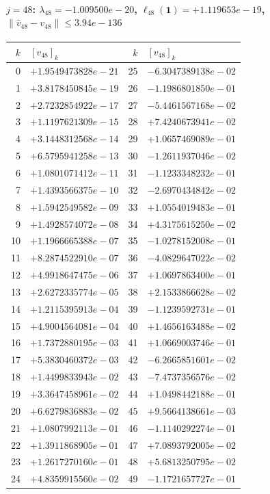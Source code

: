 \documentclass[11pt]{article}
\begin{document}
\paragraph{$j = 48$: $\lambda_{48} = -1.009500e-20$, \quad $\ell_{48}(\mathbf{1}) = +1.119653e-19$, \quad $\|\hat v_{48} - v_{48}\| \leq 3.94e-136$}
\begin{center}
{\footnotesize
\begin{tabular}{r@{\;\;}l@{\quad}r@{\;\;}l}
\toprule
$k$ & $[v_{48}]_k$ & $k$ & $[v_{48}]_k$ \\
\midrule
0 & $+1.9549473828e-21$ & 25 & $-6.3047389138e-02$ \\
1 & $+3.8178450845e-19$ & 26 & $-1.1986801850e-01$ \\
2 & $+2.7232854922e-17$ & 27 & $-5.4461567168e-02$ \\
3 & $+1.1197621309e-15$ & 28 & $+7.4240673941e-02$ \\
4 & $+3.1448312568e-14$ & 29 & $+1.0657469089e-01$ \\
5 & $+6.5795941258e-13$ & 30 & $-1.2611937046e-02$ \\
6 & $+1.0801071412e-11$ & 31 & $-1.1233348232e-01$ \\
7 & $+1.4393566375e-10$ & 32 & $-2.6970434842e-02$ \\
8 & $+1.5942549582e-09$ & 33 & $+1.0554019483e-01$ \\
9 & $+1.4928574072e-08$ & 34 & $+4.3175615250e-02$ \\
10 & $+1.1966665388e-07$ & 35 & $-1.0278152008e-01$ \\
11 & $+8.2874522910e-07$ & 36 & $-4.0829647022e-02$ \\
12 & $+4.9918647475e-06$ & 37 & $+1.0697863400e-01$ \\
13 & $+2.6272335774e-05$ & 38 & $+2.1533866628e-02$ \\
14 & $+1.2115395913e-04$ & 39 & $-1.1239592731e-01$ \\
15 & $+4.9004564081e-04$ & 40 & $+1.4656163488e-02$ \\
16 & $+1.7372880195e-03$ & 41 & $+1.0669003746e-01$ \\
17 & $+5.3830460372e-03$ & 42 & $-6.2665851601e-02$ \\
18 & $+1.4499833943e-02$ & 43 & $-7.4737356576e-02$ \\
19 & $+3.3647458961e-02$ & 44 & $+1.0498442188e-01$ \\
20 & $+6.6279836883e-02$ & 45 & $+9.5664138661e-03$ \\
21 & $+1.0807992113e-01$ & 46 & $-1.1140292274e-01$ \\
22 & $+1.3911868905e-01$ & 47 & $+7.0893792005e-02$ \\
23 & $+1.2617270160e-01$ & 48 & $+5.6813250795e-02$ \\
24 & $+4.8359915560e-02$ & 49 & $-1.1721657727e-01$ \\
\bottomrule
\end{tabular}
}
\end{center}
\end{document}
